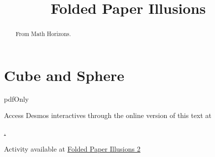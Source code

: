\documentclass{ximera}
\title{Folded Paper Illusions}
\begin{document}
\begin{abstract}
From Math Horizons.
\end{abstract}
\maketitle


 
\begin{onlineOnly}
    \begin{center}
\end{center}
\end{onlineOnly}





\section*{Cube and Sphere}


pdfOnly{
Access Desmos interactives through the online version of this text at
 
\href{https://www.desmos.com/calculator/b93e16cb9a}.
}
 
\begin{onlineOnly}
    \begin{center}
\end{center}
\end{onlineOnly}

Activity available at  \href{https://www.desmos.com/calculator/b93e16cb9a}{Folded Paper Illusions 2}
\end{document}
